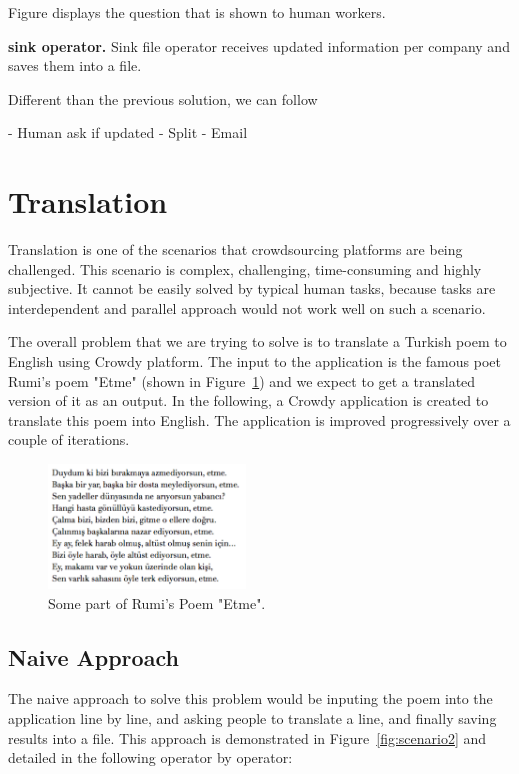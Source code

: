 Figure displays the question that is shown to human workers.


\textbf{sink operator.}
Sink file operator receives updated information per company and saves them into a file.



Different than the previous solution, we can follow 

- Human ask if updated
- Split
- Email


\section{Translation}
Translation is one of the scenarios that crowdsourcing platforms are being challenged. This scenario is complex, challenging, time-consuming and highly subjective. It cannot be easily solved by typical human tasks, because tasks are interdependent and parallel approach would not work well on such a scenario.

The overall problem that we are trying to solve is to translate a Turkish poem to English using Crowdy platform. The input to the application is the famous poet Rumi's poem "Etme" (shown in Figure~\ref{fig:scenario2.poem}) and we expect to get a translated version of it as an output. In the following, a Crowdy application  is created to translate this poem into English. The application is improved progressively over a couple of iterations.

\begin{figure}[ht]
	\centering
	\includegraphics[height=125px]{figures/scenarios/poem.png}
	\caption{Some part of Rumi's Poem "Etme".}
	\label{fig:scenario2.poem}
\end{figure}

\subsection{Naive Approach}
The naive approach to solve this problem would be inputing the poem into the application line by line, and asking people to translate a line, and finally saving results into a file. This approach is demonstrated in Figure~\ref{fig:scenario2} and detailed in the following operator by operator:

